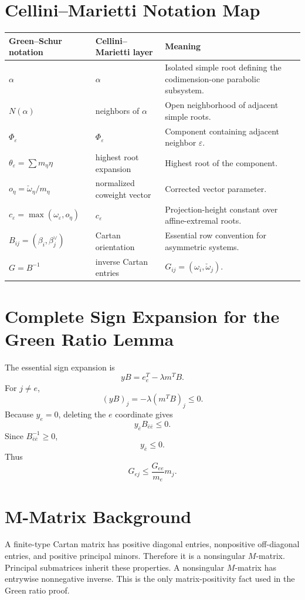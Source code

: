 \documentclass[11pt]{book}
\theoremstyle{definition}
\begin{document}
\chapter{Cellini--Marietti Notation Map}
\begin{longtable}{p{}p{}p{}}
\toprule
\textbf{Green--Schur notation} & \textbf{Cellini--Marietti layer} & \textbf{Meaning}\\
\midrule
$\alpha$ & $\alpha$ & Isolated simple root defining the codimension-one parabolic subsystem.\\
$N(\alpha)$ & neighbors of $\alpha$ & Open neighborhood of adjacent simple roots.\\
$\Phi_\varepsilon$ & $\Phi_\varepsilon$ & Component containing adjacent neighbor $\varepsilon$.\\
$\theta_\varepsilon=\sum m_\eta\eta$ & highest root expansion & Highest root of the component.\\
$o_\eta=\check\omega_\eta/m_\eta$ & normalized coweight vector & Corrected vector parameter.\\
$c_\varepsilon=\max(\omega_\varepsilon,o_\eta)$ & $c_\varepsilon$ & Projection-height constant over affine-extremal roots.\\
$B_{ij}=(\beta_i,\beta_j^\vee)$ & Cartan orientation & Essential row convention for asymmetric systems.\\
$G=B^{-1}$ & inverse Cartan entries & $G_{ij}=(\omega_i,\check\omega_j)$.\\
\bottomrule
\end{longtable}

\chapter{Complete Sign Expansion for the Green Ratio Lemma}
The essential sign expansion is
\[
 yB=e_e^T-\lambda m^TB.
\]
For $j\ne e$,
\[
 (yB)_j=-\lambda(m^TB)_j\le0.
\]
Because $y_e=0$, deleting the $e$ coordinate gives
\[
 y_{\bar e}B_{\bar e\bar e}\le0.
\]
Since $B_{\bar e\bar e}^{-1}\ge0$,
\[
 y_{\bar e}\le0.
\]
Thus
\[
 G_{ej}\le \frac{G_{ee}}{m_e}m_j.
\]

\chapter{M-Matrix Background}
A finite-type Cartan matrix has positive diagonal entries, nonpositive off-diagonal entries, and positive principal minors. Therefore it is a nonsingular $M$-matrix. Principal submatrices inherit these properties. A nonsingular $M$-matrix has entrywise nonnegative inverse. This is the only matrix-positivity fact used in the Green ratio proof.
\end{document}

